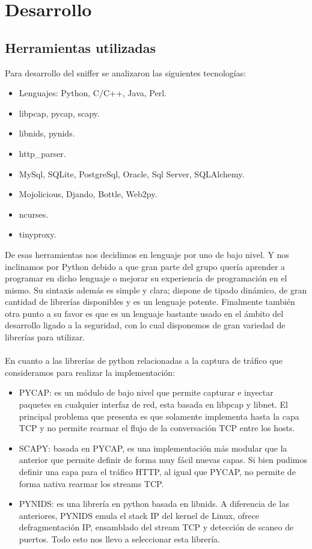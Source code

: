 \section{Desarrollo}

\subsection{Herramientas utilizadas}

Para desarrollo del sniffer se analizaron las siguientes tecnologías:

\begin{itemize}
	\item Lenguajes: Python, C/C++, Java, Perl.
	\item libpcap, pycap, scapy.
	\item libnids, pynids.
	\item http\_parser.
	\item MySql, SQLite, PostgreSql, Oracle, Sql Server, SQLAlchemy.
	\item Mojolicious, Djando, Bottle, Web2py.
	\item ncurses.
	\item tinyproxy.
\end{itemize}

De esas herramientas nos decidimos en lenguaje por uno de bajo nivel. Y nos inclinamos por Python debido a que gran parte del grupo quería aprender a programar en dicho lenguaje o mejorar su experiencia de programación en el mismo. Su sintaxis además es simple y clara; dispone de tipado dinámico, de gran cantidad de librerías disponibles y es un lenguaje potente. Finalmente también otra punto a su favor es que es un lenguaje bastante usado en el ámbito del desarrollo ligado a la seguridad, con lo cual disponemos de gran variedad de librerías para utilizar.
\\
\\\indent En cuanto a las librerías de python relacionadas a la captura de tráfico que consideramos para realizar la implementación:

\begin{itemize}
\item PYCAP: es un módulo de bajo nivel que permite capturar e inyectar paquetes en cualquier interfaz de red, esta basada en libpcap y libnet. El principal problema que presenta es que solamente implementa hasta la capa TCP y no permite rearmar el flujo de la conversación TCP entre los hosts.
\item SCAPY: basada en PYCAP, es una implementación más modular que la anterior que permite definir de forma muy fácil nuevas capas. Si bien pudimos definir una capa para el tráfico HTTP, al igual que PYCAP, no permite de forma nativa rearmar los streams TCP.
\item PYNIDS: es una librería en python basada en libnids. A diferencia de las anteriores, PYNIDS emula el stack IP del kernel de Linux, ofrece defragmentación IP, ensamblado del stream TCP y detección de scaneo de puertos. Todo esto nos llevo a seleccionar esta librería.
\end{itemize}

